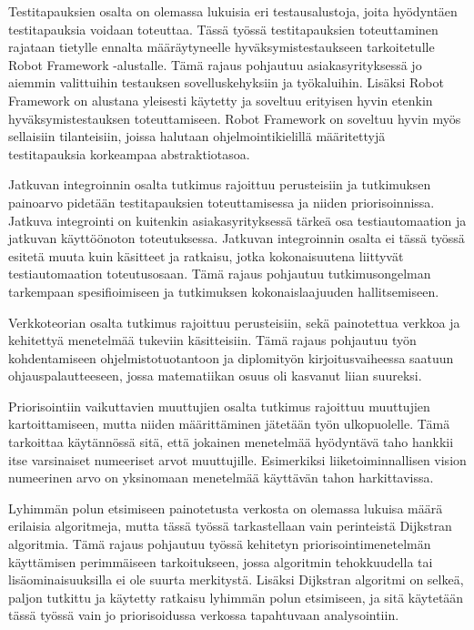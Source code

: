   Testitapauksien osalta on olemassa lukuisia eri testausalustoja, joita hyödyntäen testitapauksia voidaan toteuttaa.
  Tässä työssä testitapauksien toteuttaminen rajataan tietylle ennalta määräytyneelle hyväksymistestaukseen tarkoitetulle Robot Framework -alustalle.
  Tämä rajaus pohjautuu asiakasyrityksessä jo aiemmin valittuihin testauksen sovelluskehyksiin ja työkaluihin.
  Lisäksi Robot Framework on alustana yleisesti käytetty ja soveltuu erityisen hyvin etenkin hyväksymistestauksen toteuttamiseen.
  Robot Framework on soveltuu hyvin myös sellaisiin tilanteisiin, joissa halutaan ohjelmointikielillä määritettyjä testitapauksia korkeampaa abstraktiotasoa.

  Jatkuvan integroinnin osalta tutkimus rajoittuu perusteisiin ja tutkimuksen painoarvo pidetään testitapauksien toteuttamisessa ja niiden priorisoinnissa.
  Jatkuva integrointi on kuitenkin asiakasyrityksessä tärkeä osa testiautomaation ja jatkuvan käyttöönoton toteutuksessa.
  Jatkuvan integroinnin osalta ei tässä työssä esitetä muuta kuin käsitteet ja ratkaisu, jotka kokonaisuutena liittyvät testiautomaation toteutusosaan.
  Tämä rajaus pohjautuu tutkimusongelman tarkempaan spesifioimiseen ja tutkimuksen kokonaislaajuuden hallitsemiseen.

  Verkkoteorian osalta tutkimus rajoittuu perusteisiin, sekä painotettua verkkoa ja kehitettyä menetelmää tukeviin käsitteisiin.
  Tämä rajaus pohjautuu työn kohdentamiseen ohjelmistotuotantoon ja diplomityön kirjoitusvaiheessa saatuun ohjauspalautteeseen, jossa matematiikan osuus oli kasvanut liian suureksi.

  Priorisointiin vaikuttavien muuttujien osalta tutkimus rajoittuu muuttujien kartoittamiseen, mutta niiden määrittäminen jätetään työn ulkopuolelle.
  Tämä tarkoittaa käytännössä sitä, että jokainen menetelmää hyödyntävä taho hankkii itse varsinaiset numeeriset arvot muuttujille.
  Esimerkiksi liiketoiminnallisen vision numeerinen arvo on yksinomaan menetelmää käyttävän tahon harkittavissa.

  Lyhimmän polun etsimiseen painotetusta verkosta on olemassa lukuisa määrä erilaisia algoritmeja, mutta tässä työssä tarkastellaan vain perinteistä Dijkstran algoritmia.
  Tämä rajaus pohjautuu työssä kehitetyn priorisointimenetelmän käyttämisen perimmäiseen tarkoitukseen, jossa algoritmin tehokkuudella tai lisäominaisuuksilla ei ole suurta merkitystä.
  Lisäksi Dijkstran algoritmi on selkeä, paljon tutkittu ja käytetty ratkaisu lyhimmän polun etsimiseen, ja sitä käytetään tässä työssä vain jo priorisoidussa verkossa tapahtuvaan analysointiin.

